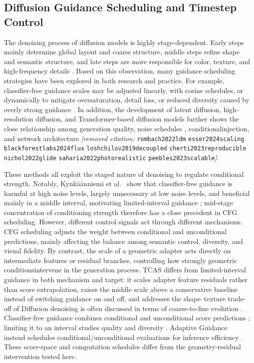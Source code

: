 \documentclass[times,twocolumn,final]{elsarticle}
\providecommand{\DIFadd}[1]{{\protect\color{blue} \sf #1}} %
\providecommand{\DIFdel}[1]{{\protect\color{red} \scriptsize #1}} %
\providecommand{\DIFaddbegin}{} %
\providecommand{\DIFdelbegin}{} %
\providecommand{\DIFdelend}{} %
\begin{document}
\subsection{Diffusion Guidance Scheduling and Timestep Control}
\label{subsec:guidance}

\DIFdelbegin \DIFdel{The denoising process of diffusion models is highly stage-dependent. Early steps mainly determine global layout and coarse structure, middle steps refine shape and semantic structure, and late steps are more responsible for color, texture, and high-frequency details \cite{ho2020ddpm,song2021ddim}. Based on this observation, many guidance scheduling strategies have been explored in both research and practice. For example, classifier-free guidance scales may be adjusted linearly, with cosine schedules, or dynamically to mitigate oversaturation, detail loss, or reduced diversity caused by overly strong guidance \cite{ho2022cfg,castillo2023adaptive}. In addition, the development of latent diffusion, high-resolution diffusion, and Transformer-based diffusion models further shows the close relationship among generation quality, noise schedules , conditionalinjection, and network architecture \textit{[removed citation: }\texttt{rombach2022ldm} \texttt{esser2024scaling} \texttt{blackforestlabs2024flux} \texttt{loshchilov2019decoupled} \texttt{cherti2023reproducible} \texttt{nichol2022glide} \texttt{saharia2022photorealistic} \texttt{peebles2023scalable}\textit{]}. }%

\DIFdel{These methods all exploit the staged nature of denoising to regulate conditional strength.
Notably, Kynk\"a\"anniemi et al. \ show that classifier-free guidance is harmful at high noise levels, largely unnecessary at low noise levels, and beneficial mainly in a middle interval, motivating limited-interval guidance \cite{kynkanniemi2024limited}; mid-stage concentration of conditioning strength therefore has a close precedent in CFG scheduling. However, different control signals act through different mechanisms. CFG scheduling adjusts the weight between conditional and unconditional predictions, mainly affecting the balance among semantic control, diversity, and visual fidelity. By contrast, the scale of a geometric adapter acts directly on intermediate features or residual branches, controlling how strongly geometric conditionsintervene in the generation process. TCAS differs from limited-interval guidance in both mechanism and target: it scales adapter feature residuals rather than score extrapolation, raises the middle scale above a conservative baseline instead of switching guidance on and off, and addresses the shape--texture trade-off of }\DIFdelend \DIFaddbegin \DIFadd{Diffusion denoising is often discussed in terms of coarse-to-fine evolution \cite{ho2020ddpm,song2021ddim}. Classifier-free guidance combines conditional and unconditional score predictions \cite{ho2022cfg}; limiting it to an interval studies quality and diversity \cite{kynkanniemi2024limited}. Adaptive Guidance instead schedules conditional/unconditional evaluations for inference efficiency \cite{castillo2023adaptive}. These score-space and computation schedules differ from the geometry-residual intervention tested here.
}
\end{document}
